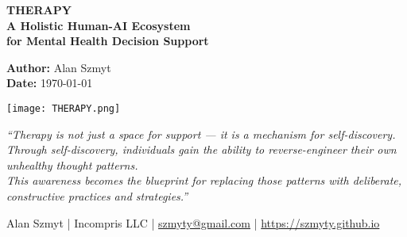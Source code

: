 \begin{titlepage}
\thispagestyle{empty}
\centering

\begin{framed}
\centering

\vspace{0.5cm}

{\LARGE\bfseries THERAPY}\\[0.6em]
{\large\bfseries A Holistic Human-AI Ecosystem}\\[0.25em]
{\large\bfseries for Mental Health Decision Support}

\vspace{1.2cm}

{\normalsize
\textbf{Author:} Alan Szmyt \\
\textbf{Date:} \today
}

\vspace{1.5cm}

\texttt{[image: THERAPY.png]}

\vspace{1.5cm}

\begin{minipage}{0.9\textwidth}
\centering
\itshape
“Therapy is not just a space for support — it is a mechanism for self-discovery.\\
Through self-discovery, individuals gain the ability to reverse-engineer their own unhealthy thought patterns.\\
This awareness becomes the blueprint for replacing those patterns with deliberate, constructive practices and strategies.”
\end{minipage}

\vspace{1cm}
\end{framed}

\vspace{0.5cm}

\begin{center}
\footnotesize
Alan Szmyt \quad | \quad Incompris LLC \quad | \quad \href{mailto:szmyty@gmail.com}{szmyty@gmail.com} \quad | \quad \url{https://szmyty.github.io}
\end{center}

\end{titlepage}
